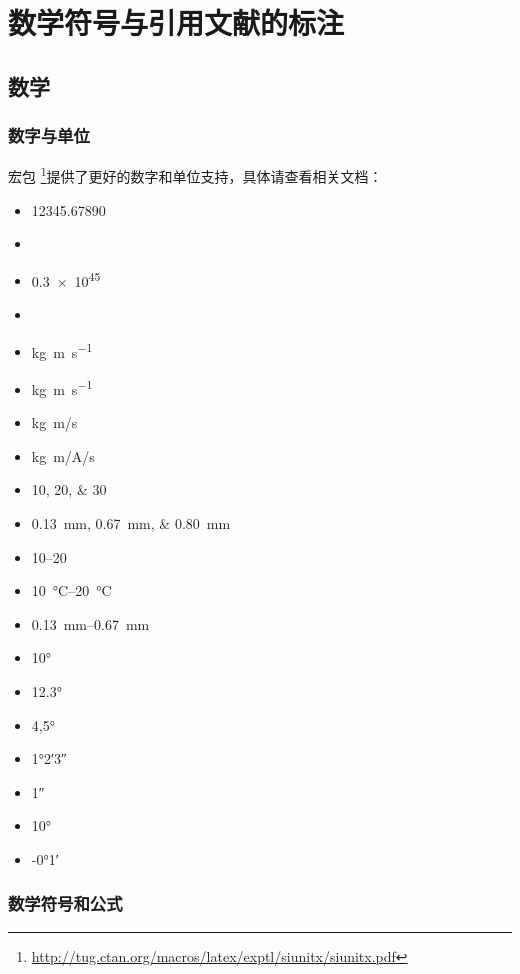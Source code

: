 \chapter{数学符号与引用文献的标注}

\section{数学}

\subsection{数字与单位}

宏包  \footnote{\url{http://tug.ctan.org/macros/latex/exptl/siunitx/siunitx.pdf}}提供了更好的数字和单位支持，具体请查看相关文档：
\begin{itemize}
	\item \num{12345,67890}
	\item {}
	\item \num{.3e45}
	\item {}
	\item \si{kg.m.s^{-1}}
	\item \si{\kilogram\metre\per\second}
	\item \si[per-mode=symbol]{\kilogram\metre\per\second}
	\item \si[per-mode=symbol]{\kilogram\metre\per\ampere\per\second}
	\item \numlist{10;20;30}
	\item \SIlist{0.13;0.67;0.80}{\milli\metre}
	\item \numrange{10}{20}
    \item \SIrange{10}{20}{\degreeCelsius}
	\item \SIrange{0.13}{0.67}{\milli\metre}
	\item \ang{10}
	\item \ang{12.3}
	\item \ang{4,5}
	\item \ang{1;2;3}
	\item \ang{;;1}
	\item \ang{+10;;}
	\item \ang{-0;1;}
\end{itemize}

\subsection{数学符号和公式}

